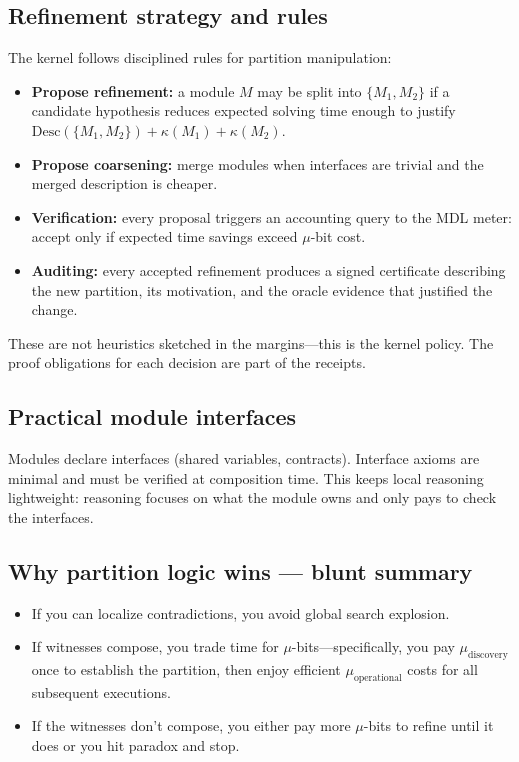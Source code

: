 \documentclass[11pt]{article}
\begin{document}
\subsection{Refinement strategy and rules}
The kernel follows disciplined rules for partition manipulation:
\begin{itemize}
  \item \textbf{Propose refinement:} a module $M$ may be split into $\{M_1,M_2\}$ if a candidate hypothesis reduces expected solving time enough to justify $\mathrm{Desc}(\{M_1,M_2\})+\kappa(M_1)+\kappa(M_2)$.
  \item \textbf{Propose coarsening:} merge modules when interfaces are trivial and the merged description is cheaper.
  \item \textbf{Verification:} every proposal triggers an accounting query to the MDL meter: accept only if expected time savings exceed $\mu$-bit cost.
  \item \textbf{Auditing:} every accepted refinement produces a signed certificate describing the new partition, its motivation, and the oracle evidence that justified the change.
\end{itemize}
These are not heuristics sketched in the margins—this is the kernel policy. The proof obligations for each decision are part of the receipts.

\subsection{Practical module interfaces}
Modules declare interfaces (shared variables, contracts). Interface axioms are minimal and must be verified at composition time. This keeps local reasoning lightweight: reasoning focuses on what the module owns and only pays to check the interfaces.

\subsection{Why partition logic wins — blunt summary}
\begin{itemize}
  \item If you can localize contradictions, you avoid global search explosion.
  \item If witnesses compose, you trade time for $\mu$-bits—specifically, you pay $\mu_{\text{discovery}}$ once to establish the partition, then enjoy efficient $\mu_{\text{operational}}$ costs for all subsequent executions.
  \item If the witnesses don't compose, you either pay more $\mu$-bits to refine until it does or you hit paradox and stop.
\end{itemize}
\end{document}
